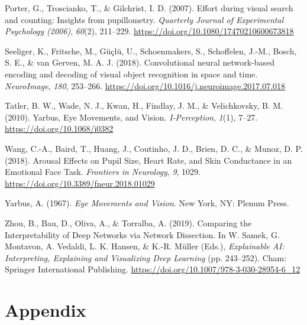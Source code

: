 \documentclass[
  english,
  man, donotrepeattitle,floatsintext]{apa6}
\begin{document}
\leavevmode\hypertarget{ref-porterEffortVisualSearch2007}{}%
Porter, G., Troscianko, T., \& Gilchrist, I. D. (2007). Effort during visual search and counting: Insights from pupillometry. \emph{Quarterly Journal of Experimental Psychology (2006)}, \emph{60}(2), 211--229. \url{https://doi.org/10.1080/17470210600673818}

\leavevmode\hypertarget{ref-seeligerConvolutionalNeuralNetworkbased2018a}{}%
Seeliger, K., Fritsche, M., Güçlü, U., Schoenmakers, S., Schoffelen, J.-M., Bosch, S. E., \& van Gerven, M. A. J. (2018). Convolutional neural network-based encoding and decoding of visual object recognition in space and time. \emph{NeuroImage}, \emph{180}, 253--266. \url{https://doi.org/10.1016/j.neuroimage.2017.07.018}

\leavevmode\hypertarget{ref-tatlerYarbusEyeMovements2010a}{}%
Tatler, B. W., Wade, N. J., Kwan, H., Findlay, J. M., \& Velichkovsky, B. M. (2010). Yarbus, Eye Movements, and Vision. \emph{I-Perception}, \emph{1}(1), 7--27. \url{https://doi.org/10.1068/i0382}

\leavevmode\hypertarget{ref-wangArousalEffectsPupil2018}{}%
Wang, C.-A., Baird, T., Huang, J., Coutinho, J. D., Brien, D. C., \& Munoz, D. P. (2018). Arousal Effects on Pupil Size, Heart Rate, and Skin Conductance in an Emotional Face Task. \emph{Frontiers in Neurology}, \emph{9}, 1029. \url{https://doi.org/10.3389/fneur.2018.01029}

\leavevmode\hypertarget{ref-yarbusEyeMovementsVision1967a}{}%
Yarbus, A. (1967). \emph{Eye Movements and Vision}. New York, NY: Plenum Press.

\leavevmode\hypertarget{ref-zhouComparingInterpretabilityDeep2019a}{}%
Zhou, B., Bau, D., Oliva, A., \& Torralba, A. (2019). Comparing the Interpretability of Deep Networks via Network Dissection. In W. Samek, G. Montavon, A. Vedaldi, L. K. Hansen, \& K.-R. Müller (Eds.), \emph{Explainable AI: Interpreting, Explaining and Visualizing Deep Learning} (pp. 243--252). Cham: Springer International Publishing. \url{https://doi.org/10.1007/978-3-030-28954-6_12}

\endgroup

\newpage

\section{Appendix}
\end{document}
